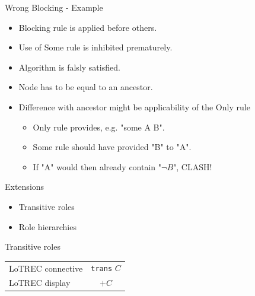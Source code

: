 \documentclass{beamer}
\begin{document}
\begin{frame}{Wrong Blocking - Example}

\begin{itemize}[<+->]
\item Blocking rule is applied before others. 
\item Use of Some rule is inhibited prematurely.
\item Algorithm is falsly satisfied.
\item Node has to be equal to an ancestor.
\item Difference with ancestor might be applicability of the Only rule
\begin{itemize}
    \item Only rule provides, e.g. "some A B".
    \item Some rule should have provided "B" to "A".
    \item If "A" would then already contain "$\neg B$", CLASH!
\end{itemize}
\end{itemize}

\end{frame}


\begin{frame}{Extensions}

\begin{itemize}
\item Transitive roles
\item Role hierarchies
\end{itemize}

\end{frame}

\begin{frame}{Transitive roles}

\begin{table}[h]
\begin{center}
\begin{tabular}{l c}
LoTREC connective & \texttt{trans} $C$ \\
LoTREC display & $+C$ \\
\end{tabular}
\end{center}
\end{table}

\begin{table}[h]
\begin{center}
\end{center}
\end{table}

\end{frame}
\end{document}
